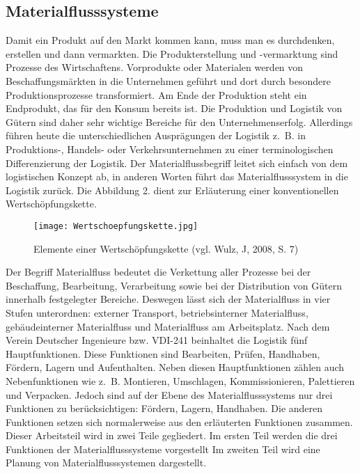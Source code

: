 \subsection{Materialflusssysteme}
Damit ein Produkt auf den Markt kommen kann, muss man es durchdenken, erstellen und dann vermarkten.
Die Produkterstellung und -vermarktung sind Prozesse des Wirtschaftens.
Vorprodukte oder Materialen werden von Beschaffungsm\"arkten in die Unternehmen gef\"uhrt und dort durch besondere Produktionsprozesse transformiert.
Am Ende der Produktion steht ein Endprodukt, das f\"ur den Konsum bereits ist. 
Die Produktion und Logistik von G\"utern sind daher sehr wichtige Bereiche f\"ur den Unternehmenserfolg.
Allerdings f\"uhren heute die unterschiedlichen Auspr\"agungen der Logistik z.~B. in Produktions-, Handels- oder 
Verkehrsunternehmen zu einer terminologischen Differenzierung der Logistik.
Der Materialflussbegriff leitet sich einfach von dem logistischen Konzept ab, in anderen Worten f\"uhrt das Materialflusssystem in die Logistik zur\"uck.
Die Abbildung 2. dient zur Erl\"auterung einer konventionellen Wertsch\"opfungskette. 
	\begin{figure}[h!]
		\centering
		\texttt{[image: Wertschoepfungskette.jpg]}
	\caption{Elemente einer Wertsch\"opfungskette (vgl. Wulz, J, 2008, S. 7)}
	\label{Wertschoepfungskette}
\end{figure}

Der Begriff Materialfluss bedeutet die Verkettung aller Prozesse bei der Beschaffung, Bearbeitung, Verarbeitung 
sowie bei der Distribution von G\"utern innerhalb festgelegter Bereiche.
Deswegen l\"asst sich der Materialfluss in vier Stufen unterordnen: externer Transport, betriebsinterner Materialfluss, 
geb\"audeinterner Materialfluss und Materialfluss am Arbeitsplatz.
Nach dem Verein Deutscher Ingenieure bzw. VDI-241 beinhaltet die Logistik f\"unf Hauptfunktionen.
Diese Funktionen sind Bearbeiten, Pr\"ufen, Handhaben, F\"ordern, Lagern und Aufenthalten.
Neben diesen Hauptfunktionen z\"ahlen auch Nebenfunktionen wie z.~B. Montieren, Umschlagen, Kommissionieren, Palettieren und Verpacken\cite{VDI:1978}.
Jedoch sind auf der Ebene des Materialflusssystems nur drei Funktionen zu ber\"ucksichtigen: F\"ordern, Lagern, Handhaben.
Die anderen Funktionen setzen sich normalerweise aus den erl\"auterten Funktionen zusammen.
Dieser Arbeitsteil wird in zwei Teile gegliedert.
Im ersten Teil werden die drei Funktionen der Materialflusssysteme vorgestellt Im zweiten Teil wird eine Planung von Materialflusssystemen dargestellt.

